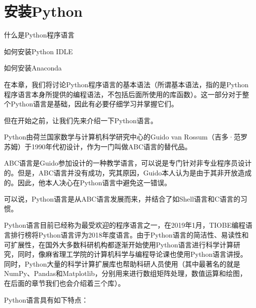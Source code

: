 \section{安装Python}\label{sec:安装Python}

\begin{Abstract}
    \item 什么是Python程序语言
    \item 如何安装Python IDLE
    \item 如何安装Anaconda
\end{Abstract}

在本章，我们将讨论Python程序语言的基本语法（所谓基本语法，指的是Python程序语言本身所提供的编程语法，不包括后面所使用的库函数）。这一部分对于整个Python语言是基础，因此有必要仔细学习并掌握它们。

但在开始之前，让我们先来介绍一下Python语言。

Python由荷兰国家数学与计算机科学研究中心的Guido van Rossum（吉多·范罗苏姆）于1990年代初设计，作为一门叫做ABC语言的替代品。 

\begin{extend}
    ABC语言是Guido参加设计的一种教学语言，可以说是专门针对非专业程序员设计的。但是，ABC语言并没有成功，究其原因，Guido本人认为是由于其非开放造成的。因此，他本人决心在Python语言中避免这一错误。

    可以说，Python语言是从ABC语言发展而来，并结合了如Shell语言和C语言的习惯。
\end{extend}

Python语言目前已经称为最受欢迎的程序语言之一，在2019年1月，TIOBE编程语言排行榜将Python语言评为2018年度语言。由于Python语言的简洁性、易读性和可扩展性，在国外大多数科研机构都逐渐开始使用Python语言进行科学计算研究，同时，像麻省理工学院的计算机科学与编程导论课也使用Python语言讲授。同时，Python大量的科学计算扩展库也帮助科研人员使用（其中最著名的就是NumPy、Pandas和Matplotlib，分别用来进行数组矩阵处理，数值运算和绘图，在后面的章节我们也会介绍着三个库）。

Python语言具有如下特点：

